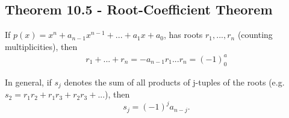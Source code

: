 \documentclass{article}
\begin{document}
\subsection{Theorem 10.5 - Root-Coefficient Theorem} 
If $ p(x) = x^n +{a}_{n-1}x^{n-1}+ ... + {a}_{1}x+{a}_{0}$, has roots ${r}_{1},...,{r}_{n}$ (counting multiplicities), 
then
\begin{equation}
\begin{aligned}
    {r}_{1}+ ... +{r}_{n} = -{a}_{n-1}
    {r}_{1}...{r}_{n} = (-1)^{a}_{0}
\end{aligned}
\end{equation}

In general, if ${s}_{j}$ denotes the sum of all products of j-tuples of the roots 
(e.g. ${s}_{2} = {r}_{1}{r}_{2}+{r}_{1}{r}_{3}+{r}_{2}{r}_{3}+...$), then\\
\begin{equation}
    {s}_{j}=(-1)^j {a}_{n-j}.
\end{equation}
\end{document}
